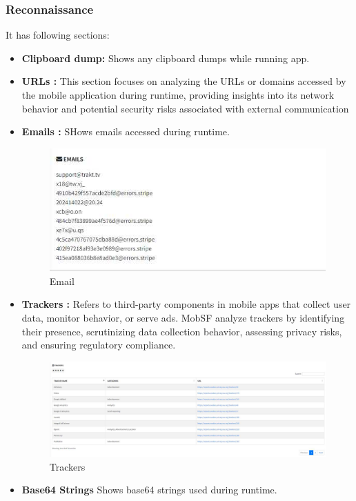 \documentclass{report}
\begin{document}
\subsubsection{Reconnaissance}
It has following sections:
\begin{itemize}
    \item \textbf {Clipboard dump: } Shows any clipboard dumps while running app.
    \item \textbf {URLs : }This section focuses on analyzing the URLs or domains accessed by the mobile application during runtime, providing insights into its network behavior and potential security risks associated with external communication
    \item \textbf {Emails : } SHows emails accessed during runtime. 
    \begin{figure}[hbt!]
    \centering
    \includegraphics[width=1\linewidth]{Dynamic Analyzer/email_rep.jpg}
    \caption{Email}
    \label{fig:example}
    \end{figure}
    \FloatBarrier

    \item \textbf {Trackers : }Refers to third-party components in mobile apps that collect user data, monitor behavior, or serve ads. MobSF analyze trackers by identifying their presence, scrutinizing data collection behavior, assessing privacy risks, and ensuring regulatory compliance.
    \begin{figure}[hbt!]
    \centering
    \includegraphics[width=1\linewidth]{Dynamic Analyzer/trackers_rep.jpg}
    \caption{Trackers}
    \label{fig:example}
    \end{figure}
    \FloatBarrier
    

    \item \textbf{Base64 Strings}
    Shows base64 strings used during runtime. 

\end{itemize}
\end{document}
